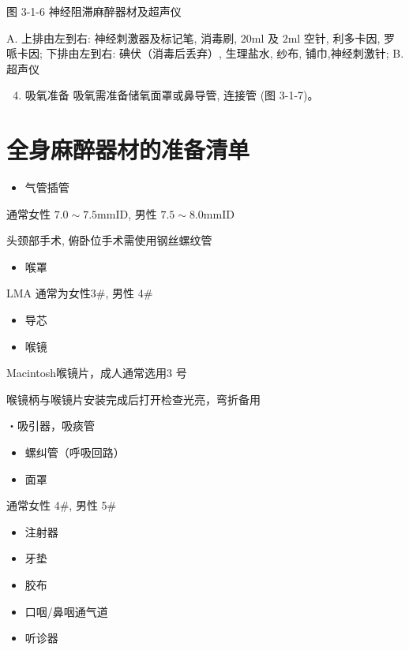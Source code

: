 \documentclass[10pt]{article}
\begin{document}
图 3-1-6 神经阻滞麻醉器材及超声仪

A. 上排由左到右: 神经刺激器及标记笔, 消毒刷, $20 \mathrm{ml}$ 及 $2 \mathrm{ml}$ 空针, 利多卡因, 罗哌卡因; 下排由左到右: 碘伏（消毒后丢弃）, 生理盐水, 纱布, 铺巾,神经刺激针; B. 超声仪

\begin{enumerate}
  \setcounter{enumi}{3}
  \item 吸氧准备 吸氧需准备储氧面罩或鼻导管, 连接管 (图 3-1-7)。
\end{enumerate}

\section*{全身麻醉器材的准备清单}
\begin{itemize}
  \item 气管插管
\end{itemize}

通常女性 $7.0 \sim 7.5 \mathrm{mmID}$, 男性 $7.5 \sim 8.0 \mathrm{mmID}$

头颈部手术, 俯卧位手术需使用钢丝螺纹管

\begin{itemize}
  \item 喉罩
\end{itemize}

LMA 通常为女性3\#, 男性 4\#

\begin{itemize}
  \item 导芯

  \item 喉镜

\end{itemize}

Macintosh喉镜片，成人通常选用3 号

喉镜柄与喉镜片安装完成后打开检查光亮，弯折备用

・吸引器，吸痰管

\begin{itemize}
  \item 螺纠管（呼吸回路）
  \item 面罩
\end{itemize}

通常女性 4\#, 男性 5\#

\begin{itemize}
  \item 注射器

  \item 牙垫

  \item 胶布

  \item 口咽/鼻咽通气道

  \item 听诊器

\end{itemize}
\end{document}
